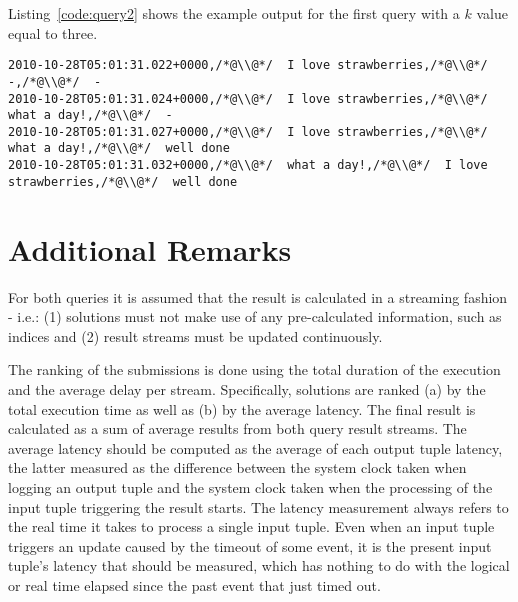 \documentclass{sig-alternate}
\begin{document}
Listing~\ref{code:query2} shows the example output for the first query with a $k$ value equal to three. 

\begin{lstlisting}[float=ht,caption={Output example for the community interest query},label={code:query2}]
2010-10-28T05:01:31.022+0000,/*@\\@*/  I love strawberries,/*@\\@*/  -,/*@\\@*/  -
2010-10-28T05:01:31.024+0000,/*@\\@*/  I love strawberries,/*@\\@*/  what a day!,/*@\\@*/  -
2010-10-28T05:01:31.027+0000,/*@\\@*/  I love strawberries,/*@\\@*/  what a day!,/*@\\@*/  well done
2010-10-28T05:01:31.032+0000,/*@\\@*/  what a day!,/*@\\@*/  I love strawberries,/*@\\@*/  well done
\end{lstlisting}

\section{Additional Remarks}
For both queries it is assumed that the result is calculated in a streaming fashion - i.e.: (1) solutions must not make use of any pre-calculated information, such as indices and (2) result streams must be updated continuously.

The ranking of the submissions is done using the total duration of the execution and the average delay per stream. Specifically, solutions are ranked (a) by the total execution time as well as (b) by the average latency. The final result is calculated as a sum of average results from both query result streams. The average latency should be computed as the average of each output tuple latency, the latter measured as the difference between the system clock taken when logging an output tuple and the system clock taken when the processing of the input tuple triggering the result starts. The latency measurement always refers to the real time it takes to process a single input tuple. Even when an input tuple triggers an update caused by the timeout of some event, it is the present input tuple's latency that should be measured, which has nothing to do with the logical or real time elapsed since the past event that just timed out.
\end{document}
